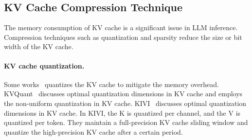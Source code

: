 \subsection{KV Cache Compression Technique}
\label{sec:bg_kv}


The memory consumption of KV cache is a significant issue in LLM inference.
Compression techniques such as quantization and sparsity reduce the size or bit width of the KV cache.


\paragraph{KV cache quantization.}
Some works~\cite{hooper2024kvquant,liu2024kivi,kang2024gear} quantizes the KV cache to mitigate the memory overhead.
KVQuant~\cite{hooper2024kvquant} discusses optimal quantization dimensions in KV cache and employs the non-uniform quantization in KV cache.
KIVI~\cite{liu2024kivi} discusses optimal quantization dimensions in KV cache.
In KIVI, the K is quantized per channel, and the V is quantized per token.
They maintain a full-precision KV cache sliding window and quantize the high-precision KV cache after a certain period.